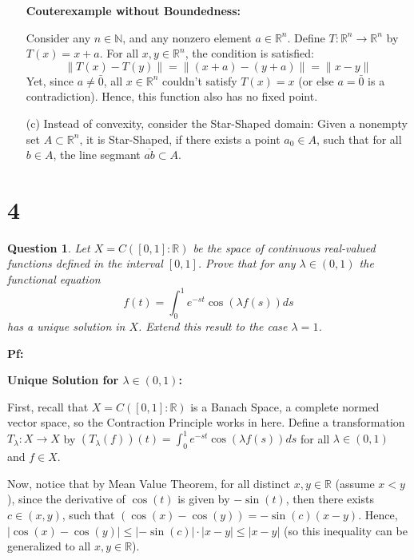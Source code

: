 \documentclass{article}
\newtheorem{question}{Question}
\begin{document}
\begin{itemize}
    \hfil

    \textbf{Couterexample without Boundedness:}

    Consider any $n\in\mathbb{N}$, and any nonzero element $a\in\mathbb{R}^n$. Define $T:\mathbb{R}^n\rightarrow\mathbb{R}^n$ by $T(x)=x+a$.
    For all $x,y\in \mathbb{R}^n$, the condition is satisfied:
    $$\|T(x)-T(y)\| = \|(x+a)-(y+a)\| = \|x-y\|$$
    Yet, since $a\neq \bar{0}$, all $x\in\mathbb{R}^n$ couldn't satisfy $T(x)=x$ (or else $a=\bar{0}$ is a contradiction). Hence, this function also has no fixed point.

    \hfil

    \item[(c)] Instead of convexity, consider the Star-Shaped domain: Given a nonempty set $A\subset \mathbb{R}^n$, it is Star-Shaped,
    if there exists a point $a_0\in A$, such that for all $b\in A$, the line segmant $\overline{ab}\subset A$.
\end{itemize}

\break

\section*{4}
\begin{myBox}[]{}
    \begin{question}
        Let $X=C([0,1]:\mathbb{R})$ be the space of continuous real-valued functions defined in the interval $[0,1]$.
        Prove that for any $\lambda\in (0,1)$ the functional equation
        $$f(t)=\int_{0}^{1}e^{-st}\cos(\lambda f(s))ds$$
        has a unique solution in $X$. Extend this result to the case $\lambda=1$.
    \end{question}
\end{myBox}

\textbf{Pf:}

\textbf{Unique Solution for $\lambda\in (0,1)$:}

First, recall that $X=C([0,1]:\mathbb{R})$ is a Banach Space, a complete normed vector space, so the Contraction Principle works in here.
Define a transformation $T_\lambda:X\rightarrow X$ by $(T_\lambda(f))(t)=\int_{0}^{1}e^{-st}\cos(\lambda f(s))ds$ for all $\lambda\in (0,1)$ and $f\in X$.

Now, notice that by Mean Value Theorem, for all distinct $x,y\in\mathbb{R}$ (assume $x<y$), since the derivative of $\cos(t)$ is given by $-\sin(t)$,
then there exists $c\in (x,y)$, such that $(\cos(x)-\cos(y))=-\sin(c)(x-y)$. Hence, $|\cos(x)-\cos(y)|\leq |-\sin(c)|\cdot|x-y| \leq |x-y|$ (so this inequality can be generalized to all $x,y\in\mathbb{R}$).
\end{document}
